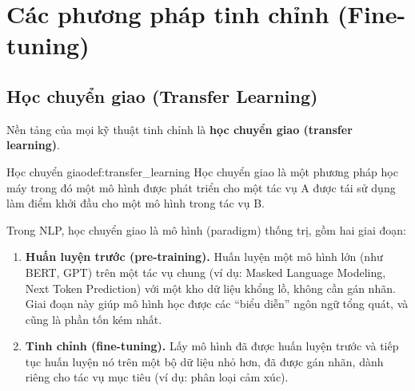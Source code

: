 
\section{Các phương pháp tinh chỉnh (Fine-tuning)}
\label{sec:finetuning_methods}

\subsection{Học chuyển giao (Transfer Learning)}
\label{ssec:transfer_learning}
Nền tảng của mọi kỹ thuật tinh chỉnh là \textbf{học chuyển giao (transfer learning)}.

\begin{definition}{Học chuyển giao}{def:transfer_learning}
    Học chuyển giao là một phương pháp học máy trong đó một mô hình được phát triển cho một tác vụ A được tái sử dụng làm điểm khởi đầu cho một mô hình trong tác vụ B.
\end{definition}

Trong NLP, học chuyển giao là mô hình (paradigm) thống trị, gồm hai giai đoạn:
\begin{enumerate}
    \item \textbf{Huấn luyện trước (pre-training).} Huấn luyện một mô hình lớn (như BERT, GPT) trên một tác vụ chung (ví dụ: Masked Language Modeling, Next Token Prediction) với một kho dữ liệu khổng lồ, không cần gán nhãn. Giai đoạn này giúp mô hình học được các “biểu diễn” ngôn ngữ tổng quát, và cũng là phần tốn kém nhất.
    \item \textbf{Tinh chỉnh (fine-tuning).} Lấy mô hình đã được huấn luyện trước và tiếp tục huấn luyện nó trên một bộ dữ liệu nhỏ hơn, đã được gán nhãn, dành riêng cho tác vụ mục tiêu (ví dụ: phân loại cảm xúc).
\end{enumerate}

\begin{center}
    \label{fig:transfer_learning_paradigm}
\end{center}

